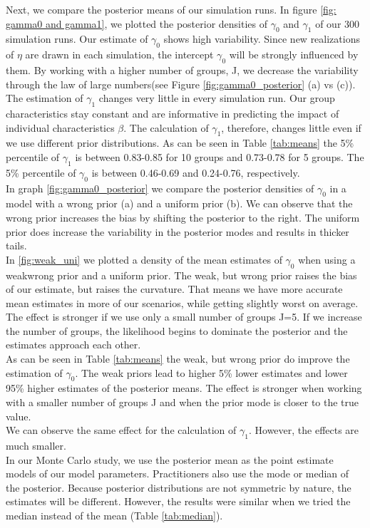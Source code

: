 Next, we compare the posterior means of our simulation runs. In figure \ref{fig: gamma0 and gamma1}, we plotted the posterior densities of $\gamma_0$ and $\gamma_1$ of our 300 simulation runs. Our estimate of $\gamma_0$ shows high variability. Since new realizations of $\eta$ are drawn in each simulation, the intercept $\gamma_0$ will be strongly influenced by them. By working with a higher number of groups, J, we decrease the variability through the law of large numbers(see Figure \ref{fig:gamma0_posterior} (a) vs (c)).
The estimation of $\gamma_1$ changes very little in every simulation run. Our group characteristics stay constant and are informative in predicting the impact of individual characteristics $\beta$.
The calculation of $\gamma_1$, therefore, changes little even if we use different prior distributions. As can be seen in Table \ref{tab:means} the 5\% percentile of $\gamma_1$ is between 0.83-0.85 for 10 groups and 0.73-0.78 for 5 groups.
The 5\% percentile of $\gamma_0$ is between 0.46-0.69 and 0.24-0.76, respectively.\\
In graph \ref{fig:gamma0_posterior} we compare the posterior densities of $\gamma_0$ in a model with a wrong prior (a) and a uniform prior (b). We can observe that the wrong prior increases the bias by shifting the posterior to the right. The uniform prior does increase the variability in the posterior modes and results in thicker tails.\\
In \ref{fig:weak_uni} we plotted a density of the mean estimates of $\gamma_0$ when using a weakwrong prior and a uniform prior. The weak, but wrong prior raises the bias of our estimate, but raises the curvature. That means we have more accurate mean estimates in more of our scenarios, while getting slightly worst on average. The effect is stronger if we use only a small number of groups J=5. If we increase the number of groups, the likelihood begins to dominate the posterior and the estimates approach each other. \\
As can be seen in Table \ref{tab:means} the weak, but wrong prior do improve the estimation of $\gamma_0$. The weak priors lead to higher 5\% lower estimates and lower 95\% higher estimates of the posterior means. The effect is stronger when working with a smaller number of groups J and when the prior mode is closer to the true value.\\
We can observe the same effect for the calculation of $\gamma_1$. However, the effects are much smaller.\\
In our Monte Carlo study, we use the posterior mean as the point estimate models of our model parameters. Practitioners also use the mode or median of the posterior. Because posterior distributions are not symmetric by nature, the estimates will be different. However, the results were similar when we tried the median instead of the mean (Table \ref{tab:median}).\\

